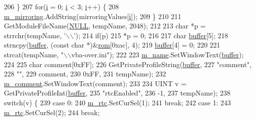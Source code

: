 \begin{DoxyCode}
206   \}
207   \textcolor{keywordflow}{for}(\mbox{\hyperlink{expr-lex_8cpp_acb559820d9ca11295b4500f179ef6392}{i}} = 0; \mbox{\hyperlink{expr-lex_8cpp_acb559820d9ca11295b4500f179ef6392}{i}} < 3; \mbox{\hyperlink{expr-lex_8cpp_acb559820d9ca11295b4500f179ef6392}{i}}++) \{
208     \mbox{\hyperlink{class_game_overrides_a3aeea798546add267de2b8a59b4d6e0e}{m\_mirroring}}.AddString(mirroringValues[\mbox{\hyperlink{expr-lex_8cpp_acb559820d9ca11295b4500f179ef6392}{i}}]);
209   \}
210 
211   GetModuleFileName(\mbox{\hyperlink{getopt1_8c_a070d2ce7b6bb7e5c05602aa8c308d0c4}{NULL}}, tempName, 2048);
212   
213   \textcolor{keywordtype}{char} *p = strrchr(tempName, \textcolor{charliteral}{'\(\backslash\)\(\backslash\)'});
214   \textcolor{keywordflow}{if}(p)
215     *p = 0;
216   
217   \textcolor{keywordtype}{char} \mbox{\hyperlink{_g_b_a_8cpp_a28d4d3d8445e73a696b2d6f7eadabd96}{buffer}}[5];
218   strncpy(\mbox{\hyperlink{_g_b_a_8cpp_a28d4d3d8445e73a696b2d6f7eadabd96}{buffer}}, (\textcolor{keyword}{const} \textcolor{keywordtype}{char} *)&\mbox{\hyperlink{_globals_8cpp_adafc6ed627110c42f3893c9783f55320}{rom}}[0xac], 4);
219   \mbox{\hyperlink{_g_b_a_8cpp_a28d4d3d8445e73a696b2d6f7eadabd96}{buffer}}[4] = 0;
220   
221   strcat(tempName, \textcolor{stringliteral}{"\(\backslash\)\(\backslash\)vba-over.ini"});
222 
223   \mbox{\hyperlink{class_game_overrides_a5726c0df72b2d2f43ee641026409f026}{m\_name}}.SetWindowText(\mbox{\hyperlink{_g_b_a_8cpp_a28d4d3d8445e73a696b2d6f7eadabd96}{buffer}});
224 
225   \textcolor{keywordtype}{char} comment[0xFF];
226   GetPrivateProfileString(\mbox{\hyperlink{_g_b_a_8cpp_a28d4d3d8445e73a696b2d6f7eadabd96}{buffer}},
227       \textcolor{stringliteral}{"comment"},
228       \textcolor{stringliteral}{""},
229       comment,
230       0xFF,
231       tempName);
232   \mbox{\hyperlink{class_game_overrides_a8fda5a63d4695c79b4bb430717a01daa}{m\_comment}}.SetWindowText(comment);
233 
234   UINT v = GetPrivateProfileInt(\mbox{\hyperlink{_g_b_a_8cpp_a28d4d3d8445e73a696b2d6f7eadabd96}{buffer}},
235                                 \textcolor{stringliteral}{"rtcEnabled"},
236                                 -1,
237                                 tempName);
238   \textcolor{keywordflow}{switch}(v) \{
239   \textcolor{keywordflow}{case} 0:
240     \mbox{\hyperlink{class_game_overrides_a68ff1f6bae098f28c5f7a30b90141781}{m\_rtc}}.SetCurSel(1);
241     \textcolor{keywordflow}{break};
242   \textcolor{keywordflow}{case} 1:
243     \mbox{\hyperlink{class_game_overrides_a68ff1f6bae098f28c5f7a30b90141781}{m\_rtc}}.SetCurSel(2);
244     \textcolor{keywordflow}{break};

\end{DoxyCode}
